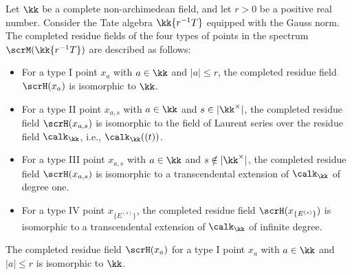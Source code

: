     \begin{proposition}\label{prop:the_complete_residue_field_of_all_four_types_points_in__spectrum_of_Tate_algebra_in_one_variable}
        Let \(\kk\) be a complete non-archimedean field, and let \(r > 0\) be a positive real number.
        Consider the Tate algebra \(\kk\{r^{-1}T\}\) equipped with the Gauss norm.
        The completed residue fields of the four types of points in the spectrum \(\scrM(\kk\{r^{-1}T\})\) are described as follows:
        \begin{itemize}
            \item For a type I point \(x_a\) with \(a \in \kk\) and \(|a| \leq r\), the completed residue field \(\scrH(x_a)\) is isomorphic to \(\kk\).
            \item For a type II point \(x_{a,s}\) with \(a \in \kk\) and \(s \in |\kk^\times|\), the completed residue field \(\scrH(x_{a,s})\) is isomorphic to the field of Laurent series over the residue field \(\calk_\kk\), i.e., \(\calk_\kk((t))\).
            \item For a type III point \(x_{a,s}\) with \(a \in \kk\) and \(s \notin |\kk^\times|\), the completed residue field \(\scrH(x_{a,s})\) is isomorphic to a transcendental extension of \(\calk_\kk\) of degree one.
            \item For a type IV point \(x_{\{E^{(s)}\}}\), the completed residue field \(\scrH(x_{\{E^{(s)}\}})\) is isomorphic to a transcendental extension of \(\calk_\kk\) of infinite degree.
        \end{itemize}
    \end{proposition}

    \begin{example}\label{eg:completed_residue_field_in_spectrum_of_Tate_algebra_in_one_variable_over_Q_p}
        The completed residue field \(\scrH(x_a)\) for a type I point \(x_a\) with \(a \in \kk\) and \(|a| \leq r\) is isomorphic to \(\kk\).
    \end{example}